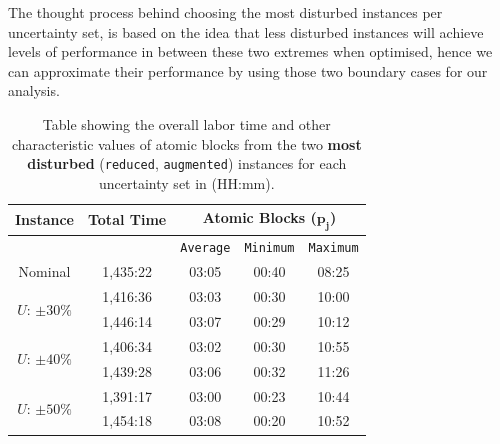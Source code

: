 \vspace{\baselineskip}
\noindent
The thought process behind choosing the most disturbed instances per uncertainty set, is based on the idea that less disturbed instances will achieve levels of performance in between these two extremes when optimised, hence we can approximate their performance by using those two boundary cases for our analysis. 


\begin{table}[t]
\small
    \centering 
    \begin{tabular}{|c|c|c|c|c|}
        \hline
        \textbf{Instance} & \textbf{Total Time} & \multicolumn{3}{|c|}{ \textbf{Atomic Blocks} \textbf{(}$\pmb{p_j}$\textbf{)}} \\
        \hline
         \multicolumn{2}{|c|}{ }  & \texttt{Average} &  \texttt{Minimum} & \texttt{Maximum} \\
        \hline
        Nominal & 1,435:22  & 03:05 & 00:40 & 08:25 \\
        \hline
        \multirow{2}{*}{$U$: $\pm30\%$} & 1,416:36 & 03:03 & 00:30 & 10:00 \\
        \cline{2-5}
         & 1,446:14 & 03:07 & 00:29 & 10:12  \\
        \hline
        \multirow{2}{*}{$U$: $\pm40\%$} & 1,406:34 & 03:02 & 00:30 & 10:55  \\
        \cline{2-5}
         & 1,439:28 & 03:06 & 00:32 & 11:26 \\
        \hline
        \multirow{2}{*}{$U$: $\pm50\%$} & 1,391:17 & 03:00 & 00:23 & 10:44  \\
        \cline{2-5}
         & 1,454:18 & 03:08 & 00:20 & 10:52  \\
        \hline
    \end{tabular}%
    \medbreak
    \caption{Table showing the overall labor time and other characteristic values of atomic blocks from the two \textbf{most disturbed} (\texttt{reduced}, \texttt{augmented}) instances for each uncertainty set in (HH:mm).}
    \label{table:Applying Uncertainty Set on Nominal}
\end{table}


